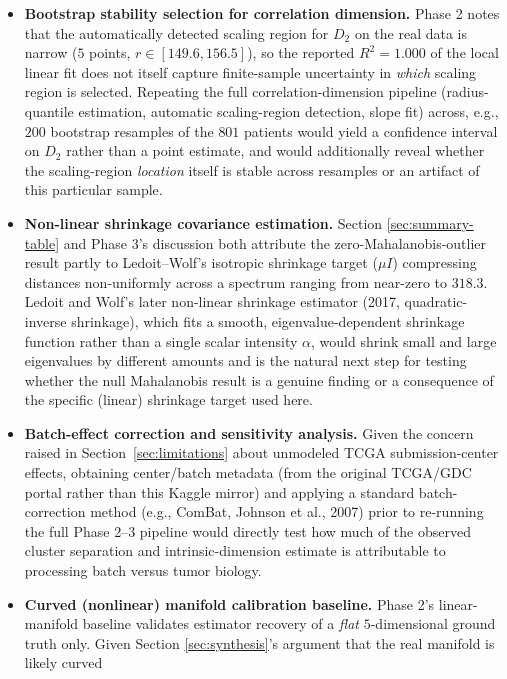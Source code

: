 \documentclass[11pt]{article}
\begin{document}
\begin{itemize}
  \item \textbf{Bootstrap stability selection for correlation dimension.}
  Phase 2 notes that the automatically detected scaling region for $D_2$ on
  the real data is narrow ($5$ points, $r \in [149.6, 156.5]$), so the
  reported $R^2 = 1.000$ of the local linear fit does not itself capture
  finite-sample uncertainty in \emph{which} scaling region is selected.
  Repeating the full correlation-dimension pipeline (radius-quantile
  estimation, automatic scaling-region detection, slope fit) across, e.g.,
  $200$ bootstrap resamples of the $801$ patients would yield a confidence
  interval on $D_2$ rather than a point estimate, and would additionally
  reveal whether the scaling-region \emph{location} itself is stable across
  resamples or an artifact of this particular sample.
  \item \textbf{Non-linear shrinkage covariance estimation.} Section
  \ref{sec:summary-table} and Phase 3's discussion both attribute the
  zero-Mahalanobis-outlier result partly to Ledoit--Wolf's isotropic
  shrinkage target ($\mu I$) compressing distances non-uniformly across a
  spectrum ranging from near-zero to $318.3$. Ledoit and Wolf's later
  non-linear shrinkage estimator (2017, quadratic-inverse shrinkage),
  which fits a smooth, eigenvalue-dependent shrinkage function rather than
  a single scalar intensity $\alpha$, would shrink small and large
  eigenvalues by different amounts and is the natural next step for
  testing whether the null Mahalanobis result is a genuine finding or a
  consequence of the specific (linear) shrinkage target used here.
  \item \textbf{Batch-effect correction and sensitivity analysis.} Given
  the concern raised in Section~\ref{sec:limitations} about unmodeled
  TCGA submission-center effects, obtaining center/batch metadata (from the
  original TCGA/GDC portal rather than this Kaggle mirror) and applying a
  standard batch-correction method (e.g., ComBat, Johnson et al., 2007)
  prior to re-running the full Phase 2--3 pipeline would directly test how
  much of the observed cluster separation and intrinsic-dimension estimate
  is attributable to processing batch versus tumor biology.
  \item \textbf{Curved (nonlinear) manifold calibration baseline.} Phase
  2's linear-manifold baseline validates estimator recovery of a
  \emph{flat} $5$-dimensional ground truth only. Given Section
  \ref{sec:synthesis}'s argument that the real manifold is likely curved

\end{itemize}
\end{document}
